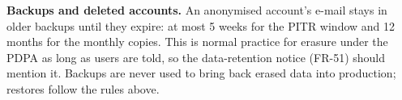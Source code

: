 \documentclass[11pt,a4paper]{article}
\begin{document}
\noindent\textbf{Backups and deleted accounts.} An anonymised account's e-mail stays in older backups until they expire: at most 5 weeks for the PITR window and 12 months for the monthly copies. This is normal practice for erasure under the PDPA as long as users are told, so the data-retention notice (FR-51) should mention it. Backups are never used to bring back erased data into production; restores follow the rules above.
\end{document}
